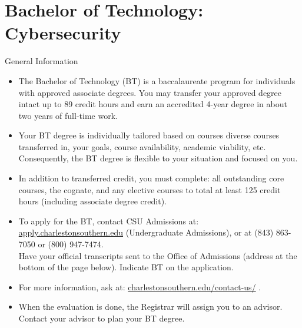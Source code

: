 %
\section*{Bachelor of Technology: Cybersecurity}

\begin{reqgroup}{General Information}
\begin{itemize}\small

	\item The Bachelor of Technology (BT) is a baccalaureate program for individuals with approved associate degrees. You may transfer your approved degree intact up to 89 credit hours and earn an accredited 4-year degree in about two years of full-time work.

	\item Your BT degree is individually tailored based on courses diverse courses transferred in, your goals, course availability, academic viability, etc. Consequently, the BT degree is flexible to your situation and focused on you.

	\item In addition to transferred credit, you must complete: all outstanding core courses, the cognate, and any elective courses to total at least 125 credit hours (including associate degree credit).

	\item To apply for the BT, contact CSU Admissions at:
		\href{https://apply.charlestonsouthern.edu/}{apply.charlestonsouthern.edu} (Undergraduate Admissions), or at (843) 863-7050 or (800) 947-7474.\\
		Have your official transcripts sent to the Office of Admissions (address at the bottom of the page below). Indicate BT on the application.

	\item For more information, ask at: \href{https://www.charlestonsouthern.edu/contact-us/}{charlestonsouthern.edu/contact-us/} .


	\item When the evaluation is done, the Registrar will assign you to an advisor. Contact your advisor to plan your BT degree.
\end{itemize}
\end{reqgroup}

